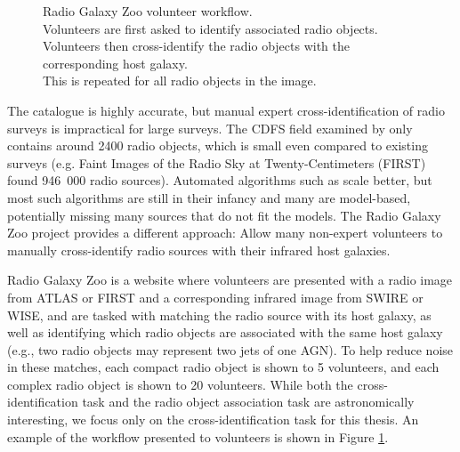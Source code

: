 \begin{figure}
\begin{subfigure}[t]{0.3\textwidth}
            \end{subfigure}
            \caption{Radio Galaxy Zoo volunteer workflow.\\
                \protect\makebox[1.5cm][r]{\ref{fig:rgz-interface-a}}
                    Volunteers are first asked to identify associated radio
                    objects.\\
                \protect\makebox[1.5cm][r]{\ref{fig:rgz-interface-b}}
                    Volunteers then cross-identify the radio objects with the
                    corresponding host galaxy.\\
                \protect\makebox[1.5cm][r]{\ref{fig:rgz-interface-c}}
                    This is repeated for all radio objects in the image.}
            \label{fig:rgz-interface}
        \end{figure}

    The \citeauthor{norris06} catalogue is highly accurate, but manual expert
    cross-identification of radio surveys is impractical for large surveys. The
    CDFS field examined by \citeauthor{norris06} only contains around 2400 radio
    objects, which is small even compared to existing surveys (e.g. Faint Images
    of the Radio Sky at Twenty-Centimeters (FIRST) \citep{becker95} found
    946~000 radio sources). Automated algorithms such as \citeauthor{fan15}
    scale better, but most such algorithms are still in their infancy
    \citeauthor{norris16} and many are model-based, potentially missing many
    sources that do not fit the models. The Radio Galaxy Zoo project
    \citep{banfield15} provides a different approach: Allow many non-expert
    volunteers to manually cross-identify radio sources with their infrared host
    galaxies.

    Radio Galaxy Zoo is a website where volunteers are presented with a radio
    image from ATLAS or FIRST and a corresponding infrared image from SWIRE or
    WISE, and are tasked with matching the radio source with its host galaxy, as
    well as identifying which radio objects are associated with the same host
    galaxy (e.g., two radio objects may represent two jets of one AGN). To help
    reduce noise in these matches, each compact radio object is shown to 5
    volunteers, and each complex radio object is shown to 20 volunteers. While
    both the cross-identification task and the radio object association task are
    astronomically interesting, we focus only on the cross-identification task
    for this thesis. An example of the workflow presented to volunteers is shown
    in Figure \ref{fig:rgz-interface}.

